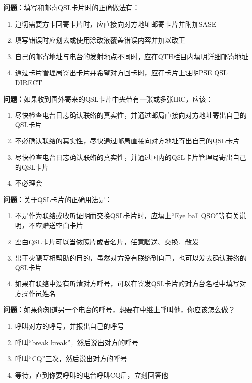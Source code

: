 \bigskip


\noindent\textbf{问题：}填写和邮寄QSL卡片时的正确做法有：
\begin{enumerate}[label=\Alph*), leftmargin=3em]
\item 迫切需要方卡回寄卡片时，应直接向对方地址邮寄卡片并附加SASE
\item 填写错误时应划去或使用涂改液覆盖错误内容并加以改正
\item 自己的邮寄地址与电台的发射地点不同时，应在QTH栏目内填明详细邮寄地址
\item 通过卡片管理局寄出卡片并希望对方回卡时，应在卡片上注明PSE QSL DIRECT
\end{enumerate}

\bigskip


\noindent\textbf{问题：}如果收到国外寄来的QSL卡片中夹带有一张或多张IRC，应该：
\begin{enumerate}[label=\Alph*), leftmargin=3em]
\item 尽快检查电台日志确认联络的真实性，并通过邮局直接向对方地址寄出自己的QSL卡片
\item 不必确认联络的真实性，尽快通过邮局直接向对方地址寄出自己的QSL卡片
\item 尽快检查电台日志确认联络的真实性，并通过国内的QSL卡片管理局寄出自己的QSL卡片
\item 不必理会
\end{enumerate}

\bigskip


\noindent\textbf{问题：}关于QSL卡片的正确用法是：
\begin{enumerate}[label=\Alph*), leftmargin=3em]
\item 不是作为联络或收听证明而交换QSL卡片时，应填上“Eye ball QSO”等有关说明，不应赠送空白卡片
\item 空白QSL卡片可以当做照片或者名片，任意赠送、交换、散发
\item 出于火腿互相帮助的目的，虽然对方没有联络到自己，也可以发去确认联络的QSL卡片
\item 如果在联络中没有听清对方呼号，可以在寄发QSL卡片的对方台名栏中填写对方操作员姓名
\end{enumerate}

\bigskip


\noindent\textbf{问题：}如果你知道另一个电台的呼号，想要在中继上呼叫他，你应该怎么做？
\begin{enumerate}[label=\Alph*), leftmargin=3em]
\item 呼叫对方的呼号，并报出自己的呼号
\item 呼叫“break break”，然后说出对方的呼号
\item 呼叫“CQ”三次，然后说出对方的呼号
\item 等待，直到你要呼叫的电台呼叫CQ后，立刻回答他
\end{enumerate}

